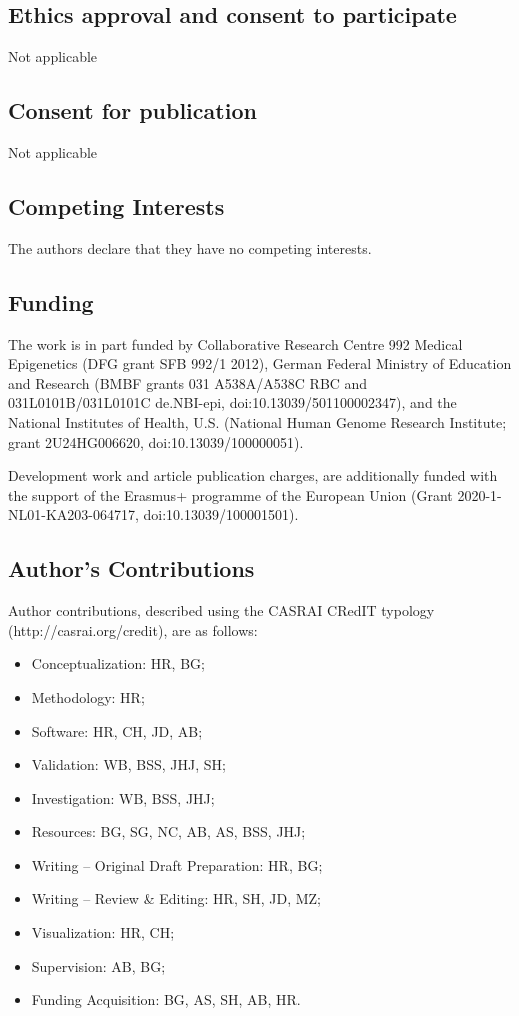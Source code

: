 \subsection*{Ethics approval and consent to participate}
Not applicable

\subsection*{Consent for publication}
Not applicable

\subsection*{Competing Interests}
The authors declare that they have no competing interests.

\subsection*{Funding}
The work is in part funded by Collaborative Research Centre 992 Medical Epigenetics (DFG grant SFB 992/1 2012), German Federal Ministry of Education and Research (BMBF grants 031 A538A/A538C RBC and 031L0101B/031L0101C de.NBI-epi, doi:10.13039/501100002347), and the National Institutes of Health, U.S. (National Human Genome Research Institute; grant 2U24HG006620, doi:10.13039/100000051).

Development work and article publication charges, are additionally funded with the support of the Erasmus+ programme of the European Union (Grant 2020-1-NL01-KA203-064717, doi:10.13039/100001501).

\subsection*{Author's Contributions}
Author contributions, described using the CASRAI CRedIT typology (http://casrai.org/credit), are as follows:

\begin{itemize}
    \item Conceptualization: HR, BG;
    \item Methodology: HR;
    \item Software: HR, CH, JD, AB;
    \item Validation: WB, BSS, JHJ, SH;
    \item Investigation: WB, BSS, JHJ;
    \item Resources: BG, SG, NC, AB, AS, BSS, JHJ;
    \item Writing – Original Draft Preparation: HR, BG;
    \item Writing – Review \& Editing: HR, SH, JD, MZ;
    \item Visualization: HR, CH;
    \item Supervision: AB, BG;
    \item Funding Acquisition: BG, AS, SH, AB, HR.
\end{itemize}

